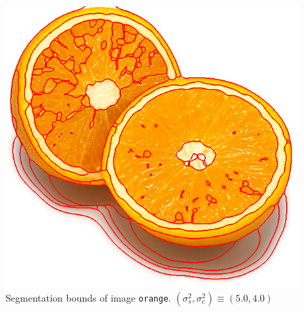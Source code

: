 {\begin{minipage}{\linewidth}
\begin{minipage}{0.45\linewidth}
\begin{figure}[H]
      \includegraphics[scale=0.4]{./images/02/orange/meanshift2_5_4.png}
      \caption{Segmentation bounds of image \texttt{orange}.
        $(\sigma_s^2, \sigma_c^2) \equiv (5.0, 4.0)$}
      \label{fig:02_orange2_5_4}
    \end{figure}
  \end{minipage}
\end{minipage}
}

